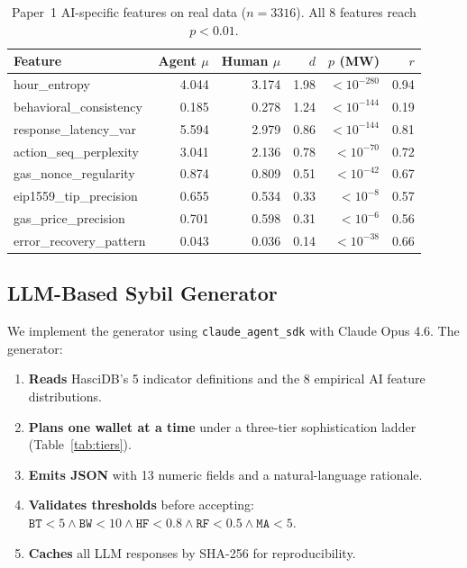 \documentclass[sigconf,nonacm=false]{acmart}
\begin{document}
\begin{table}[t]
\caption{Paper~1 AI-specific features on real data ($n{=}3316$). All 8 features reach $p{<}0.01$.}
\label{tab:ai_features}
\small
\begin{tabular}{lrrrrr}
\toprule
Feature & Agent $\mu$ & Human $\mu$ & $d$ & $p$ (MW) & $r$ \\
\midrule
hour\_entropy             & 4.044 & 3.174 & 1.98 & ${<}10^{-280}$ & 0.94 \\
behavioral\_consistency   & 0.185 & 0.278 & 1.24 & ${<}10^{-144}$ & 0.19 \\
response\_latency\_var    & 5.594 & 2.979 & 0.86 & ${<}10^{-144}$ & 0.81 \\
action\_seq\_perplexity   & 3.041 & 2.136 & 0.78 & ${<}10^{-70}$  & 0.72 \\
gas\_nonce\_regularity    & 0.874 & 0.809 & 0.51 & ${<}10^{-42}$  & 0.67 \\
eip1559\_tip\_precision   & 0.655 & 0.534 & 0.33 & ${<}10^{-8}$   & 0.57 \\
gas\_price\_precision     & 0.701 & 0.598 & 0.31 & ${<}10^{-6}$   & 0.56 \\
error\_recovery\_pattern  & 0.043 & 0.036 & 0.14 & ${<}10^{-38}$  & 0.66 \\
\bottomrule
\end{tabular}
\end{table}

\subsection{LLM-Based Sybil Generator}
\label{sec:methods:generator}

We implement the generator using \texttt{claude\_agent\_sdk} with Claude Opus 4.6. The generator:
\begin{enumerate}
  \item \textbf{Reads} HasciDB's 5 indicator definitions and the 8 empirical AI feature distributions.
  \item \textbf{Plans one wallet at a time} under a three-tier sophistication ladder (Table~\ref{tab:tiers}).
  \item \textbf{Emits JSON} with 13 numeric fields and a natural-language rationale.
  \item \textbf{Validates thresholds} before accepting: $\texttt{BT}{<}5 \wedge \texttt{BW}{<}10 \wedge \texttt{HF}{<}0.8 \wedge \texttt{RF}{<}0.5 \wedge \texttt{MA}{<}5$.
  \item \textbf{Caches} all LLM responses by SHA-256 for reproducibility.
\end{enumerate}
\end{document}
